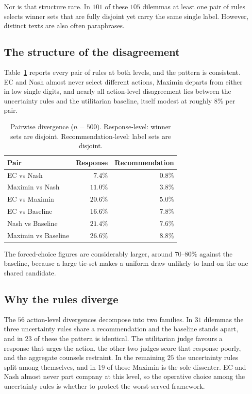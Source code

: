 \documentclass[10pt,twocolumn,a4paper]{article}
\begin{document}
Nor is that structure rare. In $101$ of these $105$ dilemmas at least
one pair of rules selects winner sets that are fully disjoint yet carry
the same single label. However, distinct texts are also often paraphrases.

\subsection{The structure of the disagreement}
\label{sec:results-pairwise}



Table~\ref{tab:pairwise} reports every pair of rules at both levels,
and the pattern is consistent. EC and Nash almost never select
different actions, Maximin departs from either in low single digits,
and nearly all action-level disagreement lies between the uncertainty
rules and the utilitarian baseline, itself modest at roughly $8\%$ per
pair.

\begin{table}[htbp]
\centering
\small
\caption{Pairwise divergence ($n = 500$). Response-level: winner sets
are disjoint. Recommendation-level: label sets are disjoint.}
\label{tab:pairwise}
\vspace{2pt}
\begin{tabular}{@{}l r r@{}}
\toprule
\textbf{Pair} & \textbf{Response} & \textbf{Recommendation} \\
\midrule
EC vs Nash            & $7.4\%$  & $0.8\%$ \\
Maximin vs Nash       & $11.0\%$ & $3.8\%$ \\
EC vs Maximin         & $20.6\%$ & $5.0\%$ \\
EC vs Baseline        & $16.6\%$ & $7.8\%$ \\
Nash vs Baseline      & $21.4\%$ & $7.6\%$ \\
Maximin vs Baseline   & $26.6\%$ & $8.8\%$ \\
\bottomrule
\end{tabular}
\end{table}

The forced-choice figures are considerably larger, around $70$--$80\%$
against the baseline, because a large tie-set makes a uniform draw
unlikely to land on the one shared candidate. 
\subsection{Why the rules diverge}
\label{sec:results-why}


The $56$ action-level divergences decompose into two families. In $31$
dilemmas the three uncertainty rules share a recommendation and the
baseline stands apart, and in $23$ of these the pattern is identical.
The utilitarian judge favours a response that urges the action, the
other two judges score that response poorly, and the aggregate counsels
restraint. In the remaining $25$ the uncertainty rules split among
themselves, and in $19$ of those Maximin is the sole dissenter. EC and
Nash almost never part company at this level, so the operative choice
among the uncertainty rules is whether to protect the worst-served
framework.
\end{document}
